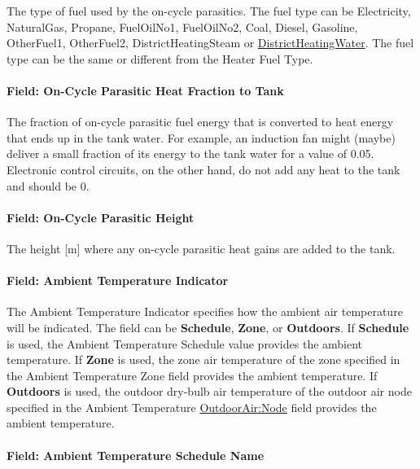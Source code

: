 The type of fuel used by the on-cycle parasitics. The fuel type can be Electricity, NaturalGas, Propane, FuelOilNo1, FuelOilNo2, Coal, Diesel, Gasoline, OtherFuel1, OtherFuel2, DistrictHeatingSteam or \hyperref[districtheating]{DistrictHeatingWater}. The fuel type can be the same or different from the Heater Fuel Type.

\paragraph{Field: On-Cycle Parasitic Heat Fraction to Tank}\label{field-on-cycle-parasitic-heat-fraction-to-tank-1}

The fraction of on-cycle parasitic fuel energy that is converted to heat energy that ends up in the tank water. For example, an induction fan might (maybe) deliver a small fraction of its energy to the tank water for a value of 0.05. Electronic control circuits, on the other hand, do not add any heat to the tank and should be 0.

\paragraph{Field: On-Cycle Parasitic Height}\label{field-on-cycle-parasitic-height}

The height {[}m{]} where any on-cycle parasitic heat gains are added to the tank.

\paragraph{Field: Ambient Temperature Indicator}\label{field-ambient-temperature-indicator-1-000}

The Ambient Temperature Indicator specifies how the ambient air temperature will be indicated. The field can be \textbf{Schedule}, \textbf{Zone}, or \textbf{Outdoors}. If \textbf{Schedule} is used, the Ambient Temperature Schedule value provides the ambient temperature. If \textbf{Zone} is used, the zone air temperature of the zone specified in the Ambient Temperature Zone field provides the ambient temperature. If \textbf{Outdoors} is used, the outdoor dry-bulb air temperature of the outdoor air node specified in the Ambient Temperature \hyperref[outdoorairnode]{OutdoorAir:Node} field provides the ambient temperature.

\paragraph{Field: Ambient Temperature Schedule Name}\label{field-ambient-temperature-schedule-name-1-000}

